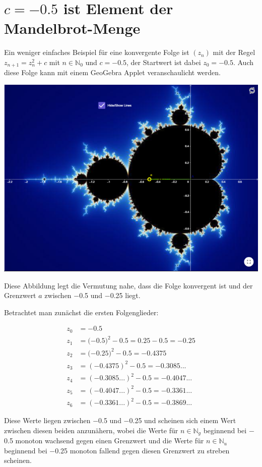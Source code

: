 \documentclass[a4paper, 12pt]{book}
\begin{document}
\section{$c=-0.5$ ist Element der Mandelbrot-Menge}

Ein weniger einfaches Beispiel für eine konvergente Folge ist
\(\left( z_{n} \right)\) mit der Regel \(z_{n + 1} = z_{n}^{2} + c\) mit
\(n \in \mathbb{N}_{0}\) und \(c =  - 0.5\), der Startwert ist dabei
\(z_{0} =  - 0.5\). Auch diese Folge kann mit einem GeoGebra Applet
veranschaulicht werden.

\begin{center}
\includegraphics[width=0.5\linewidth]{image12.png}
\end{center}


Diese Abbildung legt die Vermutung nahe, dass die Folge konvergent ist
und der Grenzwert \(a\) zwischen \(-\)0.5 und \(-\)0.25 liegt.


Betrachtet man zunächst die ersten Folgenglieder:

\begin{align*}
z_{0} &=  - 0.5\\
z_{1} &= ( - {0.5)}^{2} - 0.5 = 0.25 - 0.5 =  - 0.25\\
z_{2} &= ( - {0.25)}^{2} - 0.5 =  - 0.4375\\
z_{3} &= {( - 0.4375)}^{2} - 0.5 =  - 0.3085...\\
z_{4} &= {( - 0.3085...)}^{2} - 0.5 =  - 0.4047...\\
z_{5} &= {( - 0.4047...)}^{2} - 0.5 =  - 0.3361...\\
z_{6} &= {( - 0.3361...)}^{2} - 0.5 =  - 0.3869...
\end{align*}

Diese Werte liegen zwischen \(-\)0.5 und \(-\)0.25 und scheinen sich
einem Wert zwischen diesen beiden anzunähern, wobei die Werte für
\(n \in \mathbb{N}_{g}\) beginnend bei \(-\)0.5 monoton wachsend
gegen einen Grenzwert und die Werte für \(n \in \mathbb{N}_{u}\)
beginnend bei \(-\)0.25 monoton fallend gegen diesen Grenzwert zu
streben scheinen.
\end{document}
